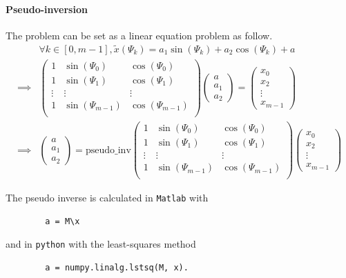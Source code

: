 \paragraph{Pseudo-inversion}
The problem can be set as a linear equation problem as follow.
\begin{align}
&\forall k \in [0,m-1], \tilde{x}(\Psi_k) = a_1 \sin(\Psi_k) + a_2 \cos(\Psi_k) + a \nonumber \\
%
\implies &
\begin{pmatrix}
1 & \sin(\Psi_0) & \cos(\Psi_0) \\
1 & \sin(\Psi_1) & \cos(\Psi_1) \\
\vdots & \vdots & \vdots \\
1 & \sin(\Psi_{m-1}) & \cos(\Psi_{m-1}) \\
\end{pmatrix}
\begin{pmatrix}
a \\ a_1 \\ a_2
\end{pmatrix}
=
\begin{pmatrix}
x_0 \\ x_2 \\ \vdots \\ x_{m-1}
\end{pmatrix} \nonumber
\\
%
\implies &
\begin{pmatrix}
a \\ a_1 \\ a_2
\end{pmatrix}
= 
\mathrm{pseudo\_inv}
\begin{pmatrix}
1 & \sin(\Psi_0) & \cos(\Psi_0) \\
1 & \sin(\Psi_1) & \cos(\Psi_1) \\
\vdots & \vdots & \vdots \\
1 & \sin(\Psi_{m-1}) & \cos(\Psi_{m-1}) \\
\end{pmatrix}
\begin{pmatrix}
x_0 \\ x_2 \\ \vdots \\ x_{m-1}
\end{pmatrix}
\end{align}

The pseudo inverse is calculated in \texttt{Matlab} with 
\begin{verbatim}
        a = M\x
\end{verbatim}
and in \texttt{python} with the least-squares method
\begin{verbatim}
        a = numpy.linalg.lstsq(M, x).
\end{verbatim}


